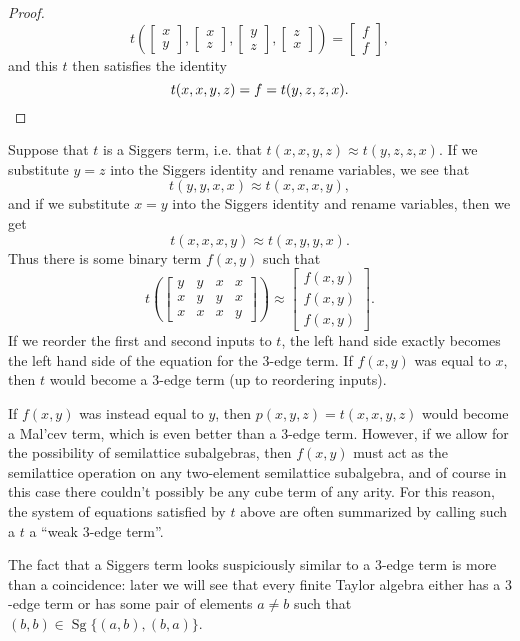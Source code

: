 \documentclass[letterpaper,11pt]{article}
\DeclareMathOperator{\Sg}{Sg}
\begin{document}
\begin{proof}
\[
t\left(\begin{bmatrix} x\\ y\end{bmatrix}, \begin{bmatrix} x\\ z\end{bmatrix}, \begin{bmatrix} y\\ z\end{bmatrix}, \begin{bmatrix} z\\ x\end{bmatrix}\right) = \begin{bmatrix} f\\ f\end{bmatrix},
\]
and this $t$ then satisfies the identity
\[
t(x,x,y,z) = f = t(y,z,z,x).\qedhere
\]
\end{proof}

\begin{rem} Suppose that $t$ is a Siggers term, i.e. that $t(x,x,y,z) \approx t(y,z,z,x)$. If we substitute $y=z$ into the Siggers identity and rename variables, we see that
\[
t(y,y,x,x) \approx t(x,x,x,y),
\]
and if we substitute $x=y$ into the Siggers identity and rename variables, then we get
\[
t(x,x,x,y) \approx t(x,y,y,x).
\]
Thus there is some binary term $f(x,y)$ such that
\[
t\left(\begin{bmatrix}y & y & x & x\\ x & y & y & x\\ x & x & x & y\end{bmatrix}\right) \approx \begin{bmatrix}f(x,y)\\f(x,y)\\f(x,y)\end{bmatrix}.
\]
If we reorder the first and second inputs to $t$, the left hand side exactly becomes the left hand side of the equation for the $3$-edge term. If $f(x,y)$ was equal to $x$, then $t$ would become a $3$-edge term (up to reordering inputs).

If $f(x,y)$ was instead equal to $y$, then $p(x,y,z) = t(x,x,y,z)$ would become a Mal'cev term, which is even better than a $3$-edge term. However, if we allow for the possibility of semilattice subalgebras, then $f(x,y)$ must act as the semilattice operation on any two-element semilattice subalgebra, and of course in this case there couldn't possibly be any cube term of any arity. For this reason, the system of equations satisfied by $t$ above are often summarized by calling such a $t$ a ``weak $3$-edge term''.

The fact that a Siggers term looks suspiciously similar to a $3$-edge term is more than a coincidence: later we will see that every finite Taylor algebra either has a $3$-edge term or has some pair of elements $a \ne b$ such that $(b,b) \in \Sg\{(a,b),(b,a)\}$.
\end{rem}
\end{document}
